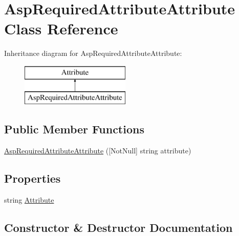 \hypertarget{class_asp_required_attribute_attribute}{}\section{Asp\+Required\+Attribute\+Attribute Class Reference}
\label{class_asp_required_attribute_attribute}
Inheritance diagram for Asp\+Required\+Attribute\+Attribute\+:\begin{figure}[H]
\begin{center}
\leavevmode
\includegraphics[height=2.000000cm]{class_asp_required_attribute_attribute}
\end{center}
\end{figure}
\subsection*{Public Member Functions}
\begin{DoxyCompactItemize}
\item 
\mbox{\hyperlink{class_asp_required_attribute_attribute_a37e197f5a5990c0140d0dc75be9ad6a6}{Asp\+Required\+Attribute\+Attribute}} (\mbox{[}Not\+Null\mbox{]} string attribute)
\end{DoxyCompactItemize}
\subsection*{Properties}
\begin{DoxyCompactItemize}
\item 
string \mbox{\hyperlink{class_asp_required_attribute_attribute_a8d782b24a958ba36ee4d63265a5db96d}{Attribute}}
\end{DoxyCompactItemize}


\subsection{Constructor \& Destructor Documentation}
\mbox{\label{class_asp_required_attribute_attribute_a37e197f5a5990c0140d0dc75be9ad6a6}} 
